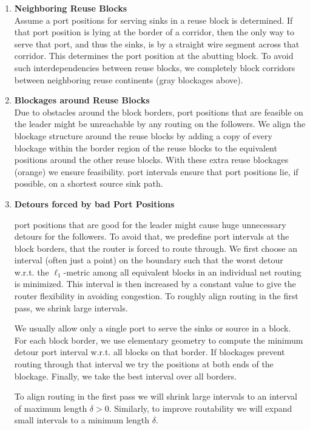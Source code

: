 \documentclass[a2paper]{bigsposter}
\begin{document}
\begin{blockrow}
\begin{enumerate}
\item \textbf{Neighboring Reuse Blocks}\\
Assume a port positions for serving sinks in a reuse block is determined. If that port position is lying at the border of a corridor, then the only way to serve that port, and thus the sinks, is by a straight wire segment across that corridor. This determines the port position at the abutting block. To avoid such interdependencies between reuse blocks, we completely block corridors between neighboring reuse continents (gray blockages above).  %
\item \textbf{Blockages around Reuse Blocks}\\
Due to obstacles around the block borders, port positions that are feasible on the leader might be unreachable by any routing on the followers.
We align the blockage structure around the reuse blocks by adding a copy of every blockage within the border region of the reuse blocks to the equivalent positions around the other reuse blocks. With these extra reuse blockages (orange)  we ensure feasibility. port intervals ensure that port positions lie, if possible, on a shortest source sink path.
\item \textbf{Detours forced by bad Port Positions}\\	
 \begin{minipage}{0.5\blockwidth}
port positions that are good for the leader might cause huge unnecessary detours  for the followers. 
To avoid that, we predefine port intervals at the block borders, that the router is forced to route through.
We first choose an interval (often just a point) on the boundary such that the worst detour w.r.t. the  $\ell_1$-metric among all equivalent blocks in an individual net routing is minimized.
This interval is then increased  by a constant value to give the router flexibility in avoiding congestion. To roughly align routing in the first pass, we shrink large intervals.

We usually allow only a single port to serve the sinks or source in a block.
For each block border, we use elementary geometry to compute the minimum detour port interval w.r.t. all blocks on that border.  If blockages prevent
routing through that interval we try the positions at both ends of the
blockage.  Finally, we take the best interval over all borders.

To align routing in the first pass we will shrink large intervals to an interval of maximum  length $\delta>0$.
Similarly, to improve routability we will expand small intervals to a minimum length $\delta$.


\end{minipage}
\end{enumerate}
\end{blockrow}
\end{document}
